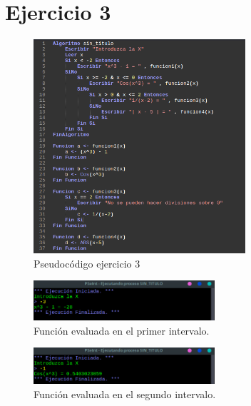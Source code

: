 \documentclass[11pt, a4paper]{report}
\begin{document}
\newpage
\section*{Ejercicio 3}

\begin{figure}[!ht]
\begin{center}
  \includegraphics[width=0.7\textwidth]{ejercicio3.png}
  \caption{Pseudoc\'odigo ejercicio 3}
\end{center}
\end{figure}

\begin{figure}[!ht]
\begin{center}
  \includegraphics[width=0.6\textwidth]{respuesta5.png}
  \caption{Funci\'on evaluada en el primer intervalo.}
\end{center}
\end{figure} 

\begin{figure}[!ht]
\begin{center}
  \includegraphics[width=0.6\textwidth]{respuesta6.png}
  \caption{Funci\'on evaluada en el segundo intervalo.}
\end{center}
\end{figure} 
\end{document}
